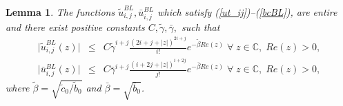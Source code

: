 \documentclass[10pt,a4paper]{amsart}
\newtheorem{lemma}{Lemma}
\begin{document}
\begin{lemma}
\label{lem:ut_ij}
The functions $\tilde{u}^{BL}_{i,j}, \bar{u}^{BL}_{i,j}$ which satisfy (\ref{ut_ij})--(\ref{bcBL}), are entire and there exist
positive constants $C, \tilde{\gamma}, \bar{\gamma},$ such that
%
\begin{eqnarray*}
\vert \tilde{u}^{BL}_{i,j}(z) \vert &\leq& C \tilde{\gamma}^{i+j} \frac{(2i+j+|z|)^{2i+j}}{i!} e^{-\tilde{\beta} Re(z)} \; \forall \; z \in \mathbb{C}, \; Re(z) > 0,\\
\vert \bar{u}^{BL}_{i,j}(z) \vert &\leq& C \bar{\gamma}^{i+j} \frac{(i+2j+|z|)^{i+2j}}{j!} e^{-\bar{\beta} Re(z)} \; \forall \; z \in \mathbb{C}, \; Re(z) > 0,
\end{eqnarray*}
%
where $\tilde{\beta}=\sqrt{\tilde{c}_{0} / \tilde{b}_{0}}$ and $\bar{\beta}=\sqrt{\bar{b}_{0}}$.
\end{lemma}
\end{document}
